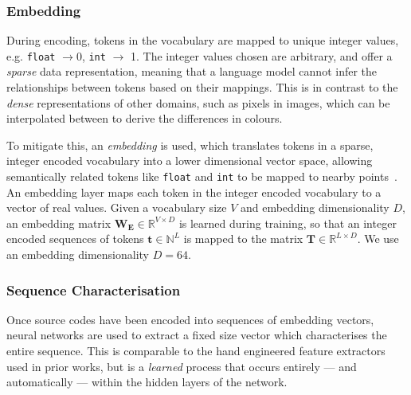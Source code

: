 \begin{algorithm}
  
  \caption[Deriving a vocabulary from a string]{%
    Deriving a vocabulary from a string.%
  }
  \label{alg:maxmunch-tokenization}
\end{algorithm}



\subsubsection{Embedding}

During encoding, tokens in the vocabulary are mapped to unique integer values, e.g. \texttt{float} $\rightarrow 0$, \texttt{int} $\rightarrow$ 1. The integer values chosen are arbitrary, and offer a \emph{sparse} data representation, meaning that a language model cannot infer the relationships between tokens based on their mappings. This is in contrast to the \emph{dense} representations of other domains, such as pixels in images, which can be interpolated between to derive the differences in colours.

To mitigate this, an \emph{embedding} is used, which translates tokens in a sparse, integer encoded vocabulary into a lower dimensional vector space, allowing semantically related tokens like \texttt{float} and \texttt{int} to be mapped to nearby points~\cite{Mikolov2013a,Baroni2014}. An embedding layer maps each token in the integer encoded vocabulary to a vector of real values. Given a vocabulary size $V$ and embedding dimensionality $D$, an embedding matrix $\bm{W_{E}} \in \mathbb{R}^{V \times D}$ is learned during training, so that an integer encoded sequences of tokens $\bm{t} \in \mathbb{N}^{L}$ is mapped to the matrix $\bm{T} \in \mathbb{R}^{L \times D}$. We use an embedding dimensionality $D = 64$.

\subsubsection{Sequence Characterisation}

Once source codes have been encoded into sequences of embedding vectors, neural networks are used to extract a fixed size vector which characterises the entire sequence. This is comparable to the hand engineered feature extractors used in prior works, but is a \emph{learned} process that occurs entirely --- and automatically --- within the hidden layers of the network.

